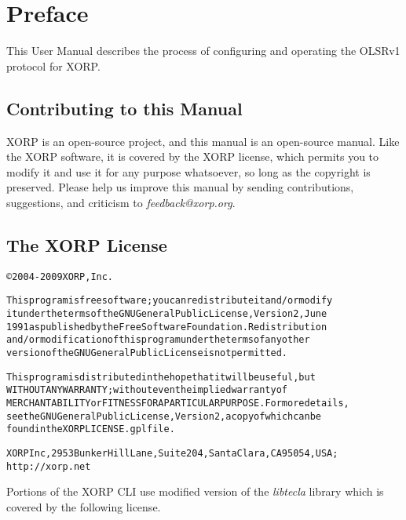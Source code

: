 %
%

\chapter*{Preface}

\vspace{-0.1in}
This User Manual describes the process of configuring and operating
the OLSRv1 protocol for XORP.

\section*{Contributing to this Manual}
\vspace{-0.1in}
XORP is an open-source project, and this manual is an open-source
manual.  Like the XORP software, it is covered by the XORP license,
which permits you to modify it and use it for any purpose whatsoever,
so long as the copyright is preserved.  Please help us improve this
manual by sending contributions, suggestions, and criticism to {\it
  feedback@xorp.org}.

\section*{The XORP License}
\vspace{-0.3in}
\begin{alltt}
\small\noindent
\copyright 2004-2009 XORP, Inc.

This program is free software; you can redistribute it and/or modify
it under the terms of the GNU General Public License, Version 2, June
1991 as published by the Free Software Foundation. Redistribution
and/or modification of this program under the terms of any other
version of the GNU General Public License is not permitted.

This program is distributed in the hope that it will be useful, but
WITHOUT ANY WARRANTY; without even the implied warranty of
MERCHANTABILITY or FITNESS FOR A PARTICULAR PURPOSE. For more details,
see the GNU General Public License, Version 2, a copy of which can be
found in the XORP LICENSE.gpl file.

XORP Inc, 2953 Bunker Hill Lane, Suite 204, Santa Clara, CA 95054, USA;
http://xorp.net
\end{alltt}

Portions of the XORP CLI use modified version of the {\it libtecla}
library which is covered by the following license.


